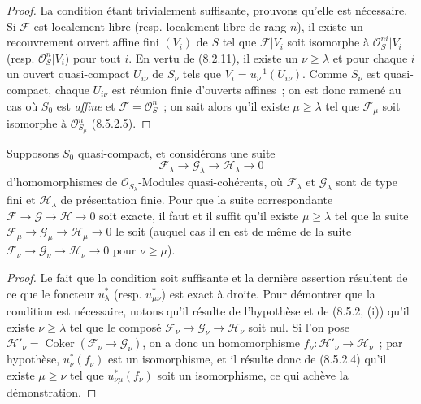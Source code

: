 \begin{proof}
La condition étant trivialement suffisante, prouvons qu'elle est nécessaire.
Si $\mathcal F$ est localement libre (resp. localement libre de rang $n$), il
existe un recouvrement ouvert affine fini $(V_i)$ de $S$ tel que
$\mathcal F|V_i$ soit isomorphe à $\mathcal O_S^{ni}|V_i$ (resp.
$\mathcal O_S^n|V_i$) pour tout $i$. En vertu de (8.2.11), il existe un
$\nu\geq\lambda$ et pour chaque $i$ un ouvert quasi-compact $U_{i\nu}$ de
$S_\nu$ tels que $V_i=u_\nu^{-1}(U_{i\nu})$. Comme $S_\nu$ est quasi-compact,
chaque $U_{i\nu}$ est réunion finie d'ouverts affines~; on est donc ramené au
cas où $S_0$ est \emph{affine} et $\mathcal F=\mathcal O_S^n$~; on sait alors qu'il
existe $\mu\geq\lambda$ tel que $\mathcal F_\mu$ soit isomorphe à
$\mathcal O_{S_\mu}^n$ (8.5.2.5).
\end{proof}

\begin{proposition}[8.5.6]
\label{IV.8.5.6-fr}
Supposons $S_0$ quasi-compact, et considérons une suite
\[
  \mathcal F_\lambda\longrightarrow\mathcal G_\lambda
  \longrightarrow\mathcal H_\lambda\longrightarrow0
\]
d'homomorphismes de $\mathcal O_{S_\lambda}$-Modules quasi-cohérents, où
$\mathcal F_\lambda$ et $\mathcal G_\lambda$ sont de type fini et
$\mathcal H_\lambda$ de présentation finie. Pour que la suite correspondante
$\mathcal F\to\mathcal G\to\mathcal H\to0$ soit exacte, il faut et il suffit
qu'il existe $\mu\geq\lambda$ tel que la suite
$\mathcal F_\mu\to\mathcal G_\mu\to\mathcal H_\mu\to0$ le soit (auquel cas il
en est de même de la suite
$\mathcal F_\nu\to\mathcal G_\nu\to\mathcal H_\nu\to0$ pour
$\nu\geq\mu$).
\end{proposition}

\begin{proof}
Le fait que la condition soit suffisante et la dernière assertion résultent
de ce que le foncteur $u_\lambda^*$ (resp. $u_{\mu\nu}^*$) est exact à droite.
Pour démontrer que la condition est nécessaire, notons qu'il résulte de
l'hypothèse et de (8.5.2, (i)) qu'il existe $\nu\geq\lambda$ tel que le composé
$\mathcal F_\nu\to\mathcal G_\nu\to\mathcal H_\nu$ soit nul. Si l'on pose
$\mathcal H'_\nu=\operatorname{Coker}(\mathcal F_\nu\to\mathcal G_\nu)$, on a
donc un homomorphisme $f_\nu:\mathcal H'_\nu\to\mathcal H_\nu$~; par
hypothèse, $u_\nu^*(f_\nu)$ est un isomorphisme, et il résulte donc de
(8.5.2.4) qu'il existe $\mu\geq\nu$ tel que $u_{\nu\mu}^*(f_\nu)$ soit un
isomorphisme, ce qui achève la démonstration.
\end{proof}

